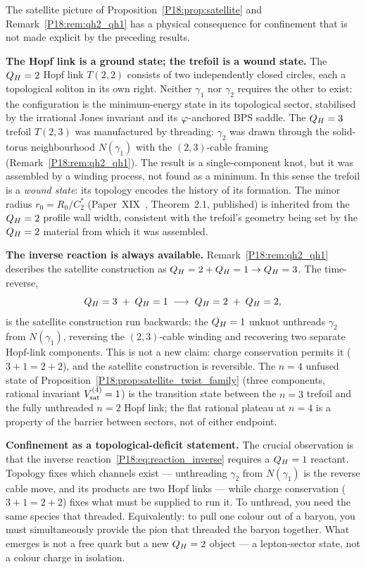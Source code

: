 \begin{remark}
\label{P18:rem:wound_state}
The satellite picture of Proposition~\ref{P18:prop:satellite} and
Remark~\ref{P18:rem:qh2_qh1} has a physical consequence for
confinement that is not made explicit by the preceding results.

\textbf{The Hopf link is a ground state; the trefoil is a wound state.}
The $Q_H=2$ Hopf link $T(2,2)$ consists of two independently
closed circles, each a topological soliton in its own right.
Neither $\gamma_1$ nor $\gamma_2$ requires the other to exist:
the configuration is the minimum-energy state in its topological
sector, stabilised by the irrational Jones invariant and its
$\varphi$-anchored BPS saddle.
The $Q_H=3$ trefoil $T(2,3)$ was manufactured by threading:
$\gamma_2$ was drawn through the solid-torus neighbourhood
$N(\gamma_1)$ with the $(2,3)$-cable framing
(Remark~\ref{P18:rem:qh2_qh1}).  The result is a single-component
knot, but it was assembled by a winding process, not found as a
minimum.  In this sense the trefoil is a \emph{wound state}: its
topology encodes the history of its formation.  The minor radius
$r_0=R_0/C_2^*$ (Paper~XIX~\cite{Paper19}, Theorem~2.1, %
published) is inherited from the $Q_H=2$ profile wall width,
consistent with the trefoil's geometry being set by the $Q_H=2$
material from which it was assembled.

\textbf{The inverse reaction is always available.}
Remark~\ref{P18:rem:qh2_qh1} describes the satellite construction
as $Q_H=2+Q_H=1\to Q_H=3$.  The time-reverse,
\begin{equation}
  Q_H=3 \;+\; Q_H=1 \;\longrightarrow\; Q_H=2 \;+\; Q_H=2,
  \label{P18:eq:reaction_inverse}
\end{equation}
is the satellite construction run backwards: the $Q_H=1$ unknot
unthreads $\gamma_2$ from $N(\gamma_1)$, reversing the
$(2,3)$-cable winding and recovering two separate Hopf-link
components.  This is not a new claim: charge conservation permits
it ($3+1=2+2$), and the satellite construction is reversible.
The $n=4$ unfused state of Proposition~\ref{P18:prop:satellite_twist_family}
(three components, rational invariant $V_{\rm sat}^{(4)}=1$)
is the transition state between the $n=3$ trefoil and the fully
unthreaded $n=2$ Hopf link; the flat rational plateau at $n=4$
is a property of the barrier between sectors, not of either
endpoint.

\textbf{Confinement as a topological-deficit statement.}
The crucial observation is that the inverse
reaction~\eqref{P18:eq:reaction_inverse} requires a $Q_H=1$
reactant.  Topology fixes which channels exist --- unthreading
$\gamma_2$ from $N(\gamma_1)$ is the reverse cable move, and its
products are two Hopf links --- while charge conservation
($3+1=2+2$) fixes what must be supplied to run it.  To unthread, you need the
same species that threaded.  Equivalently: to pull one colour
out of a baryon, you must simultaneously provide the pion that
threaded the baryon together.  What emerges is not a free quark
but a new $Q_H=2$ object --- a lepton-sector state, not a colour
charge in isolation.


\end{remark}
